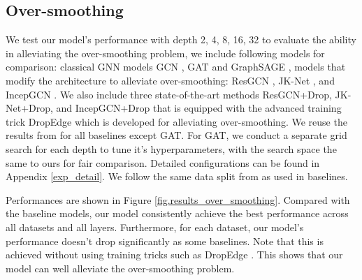 \documentclass{article}
\begin{document}
\subsection{Over-smoothing}
\label{setting_smooth}
We test our model's performance with depth 2, 4, 8, 16, 32 to evaluate the ability in alleviating the over-smoothing problem, we include following models for comparison: classical GNN models GCN \citep{kipf2016semi}, GAT \citep{velivckovic2017graph} and GraphSAGE \citep{hamilton2017inductive}, models that modify the architecture to alleviate over-smoothing: ResGCN \citep{li2019deepgcns}, JK-Net \citep{xu2018representation}, and IncepGCN \citep{rong2019dropedge}. We also include three state-of-the-art methods ResGCN+Drop, JK-Net+Drop, and IncepGCN+Drop that is equipped with the advanced training trick DropEdge \citep{rong2019dropedge} which is developed for alleviating over-smoothing. We reuse the results from \citet{rong2019dropedge} for all baselines except GAT. For GAT, we conduct a separate grid search for each depth to tune it's hyperparameters, with the search space the same to ours for fair comparison. Detailed configurations can be found in Appendix \ref{exp_detail}. We follow the same data split from \citet{rong2019dropedge} as used in baselines.

Performances are shown in Figure \ref{fig.results_over_smoothing}. Compared with the baseline models, our model consistently achieve the best performance across all datasets and all layers. Furthermore, for each dataset, our model's performance doesn't drop significantly as some baselines. Note that this is achieved without using training tricks such as DropEdge \citep{rong2019dropedge}. This shows that our model can well alleviate the over-smoothing problem.
\end{document}
